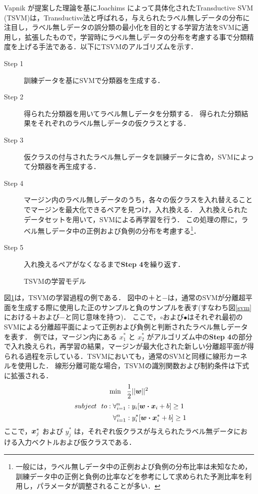 Vapnik \cite{vapnik}が提案した理論を基にJoachims \cite{joachims}によって具体化されたTransductive SVM (TSVM)は，Transductive法と呼ばれる，与えられたラベル無しデータの分布に注目し，ラベル無しデータの誤分類の最小化を目的とする学習方法をSVMに適用し，拡張したもので，学習時にラベル無しデータの分布を考慮する事で分類精度を上げる手法である．以下にTSVMのアルゴリズムを示す．
\begin{description}
\item[Step 1] 訓練データを基にSVMで分類器を生成する．

\item[Step 2]得られた分類器を用いてラベル無しデータを分類する．
得られた分類結果をそれぞれのラベル無しデータの仮クラスとする．

\item[Step 3] 仮クラスの付与されたラベル無しデータを訓練データに含め，SVMによって分類器を再生成する．

\item[Step 4] マージン内のラベル無しデータのうち，各々の仮クラスを入れ替えることでマージンを最大化できるペアを見つけ，入れ換える．
入れ換えられたデータセットを用いて，SVMによる再学習を行う．
この処理の際に，ラベル無しデータ中の正例および負例の分布を考慮する\footnote{一般には，ラベル無しデータ中の正例および負例の分布比率は未知なため，訓練データ中の正例と負例の比率などを参考にして求められた予測比率を利用し，パラメータが調整されることが多い．}．

\item[Step 5] 入れ換えるペアがなくなるまで{\bf Step 4}を繰り返す．

\end{description}
\begin{figure}
\begin{center}
\end{center}
\vspace{-3mm}
\caption{TSVMの学習モデル}
\label{tsvm}
\end{figure}
図\ref{tsvm}は，TSVMの学習過程の例である．
図中の＋と−は，通常のSVMが分離超平面を生成する際に使用した正のサンプルと負のサンプルを表す(すなわち図\ref{svm}における＋および−と同じ意味を持つ)．
ここで，$\circ$および$\bullet$はそれぞれ最初のSVMによる分離超平面によって正例および負例と判断されたラベル無しデータを表す．
例では，マージン内にある \mbox{\boldmath $x^*_1$} と \mbox{\boldmath $x^*_2$} がアルゴリズム中の{\bf Step 4}の部分で入れ換えられ，再学習の結果，マージンが最大化された新しい分離超平面が得られる過程を示している．TSVMにおいても，通常のSVMと同様に線形カーネルを使用した．
線形分離可能な場合，TSVMの識別関数および制約条件は下式に拡張される．
\begin{equation}
\min~~\frac{1}{2}||{\mbox{\boldmath $w$}}||^{2} 
\end{equation}
\[subject~~to: \forall^{n}_{i=1}: y_{i}[{\mbox{\boldmath $w \cdot x$}}_{i}+b] \geq 1\]
\[\hspace*{6em}\forall^{n}_{i=1}:y_{i}^{*}[{\mbox{\boldmath $w \cdot x$}}_{i}^{*}+b] \geq 1\]
ここで，${\mbox{\boldmath $x$}}_{j}^{*}$ および $y_{j}^{*}$ は，それぞれ仮クラスが与えられたラベル無データにおける入力ベクトルおよび仮クラスである．

